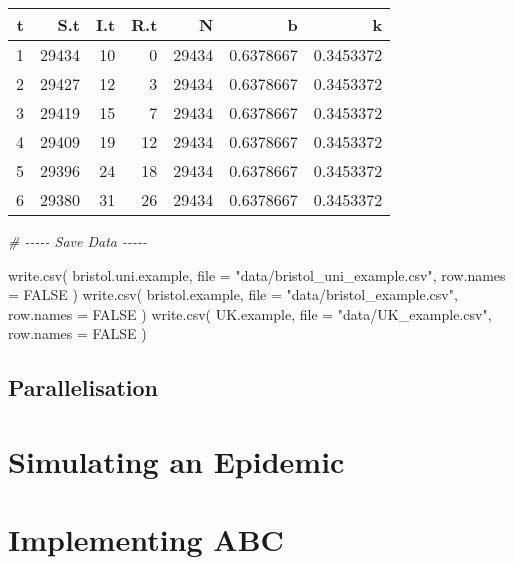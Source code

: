 \documentclass[
]{article}
\newenvironment{Shaded}{\begin{snugshade}}{\end{snugshade}}
\newcommand{\AttributeTok}[1]{\textcolor[rgb]{0.77,0.63,0.00}{#1}}
\newcommand{\CommentTok}[1]{\textcolor[rgb]{0.56,0.35,0.01}{\textit{#1}}}
\newcommand{\ConstantTok}[1]{\textcolor[rgb]{0.00,0.00,0.00}{#1}}
\newcommand{\FunctionTok}[1]{\textcolor[rgb]{0.00,0.00,0.00}{#1}}
\newcommand{\NormalTok}[1]{#1}
\newcommand{\StringTok}[1]{\textcolor[rgb]{0.31,0.60,0.02}{#1}}
\begin{document}
\begin{longtable}[]{@{}rrrrrrr@{}}
\toprule()
t & S.t & I.t & R.t & N & b & k \\
\midrule()
\endhead
1 & 29434 & 10 & 0 & 29434 & 0.6378667 & 0.3453372 \\
2 & 29427 & 12 & 3 & 29434 & 0.6378667 & 0.3453372 \\
3 & 29419 & 15 & 7 & 29434 & 0.6378667 & 0.3453372 \\
4 & 29409 & 19 & 12 & 29434 & 0.6378667 & 0.3453372 \\
5 & 29396 & 24 & 18 & 29434 & 0.6378667 & 0.3453372 \\
6 & 29380 & 31 & 26 & 29434 & 0.6378667 & 0.3453372 \\
\bottomrule()
\end{longtable}

\begin{Shaded}
\begin{Highlighting}[]
\CommentTok{\# {-}{-}{-}{-}{-} Save Data {-}{-}{-}{-}{-}}

\FunctionTok{write.csv}\NormalTok{( bristol.uni.example, }\AttributeTok{file =} \StringTok{"data/bristol\_uni\_example.csv"}\NormalTok{, }\AttributeTok{row.names =} \ConstantTok{FALSE}\NormalTok{ )}
\FunctionTok{write.csv}\NormalTok{( bristol.example,     }\AttributeTok{file =} \StringTok{"data/bristol\_example.csv"}\NormalTok{, }\AttributeTok{row.names =} \ConstantTok{FALSE}\NormalTok{ )}
\FunctionTok{write.csv}\NormalTok{( UK.example,          }\AttributeTok{file =} \StringTok{"data/UK\_example.csv"}\NormalTok{, }\AttributeTok{row.names =} \ConstantTok{FALSE}\NormalTok{ )}
\end{Highlighting}
\end{Shaded}

\hypertarget{parallelisation}{%
\subsection{Parallelisation}\label{parallelisation}}

\hypertarget{simulating-an-epidemic}{%
\section{Simulating an Epidemic}\label{simulating-an-epidemic}}

\hypertarget{implementing-abc}{%
\section{Implementing ABC}\label{implementing-abc}}
\end{document}
